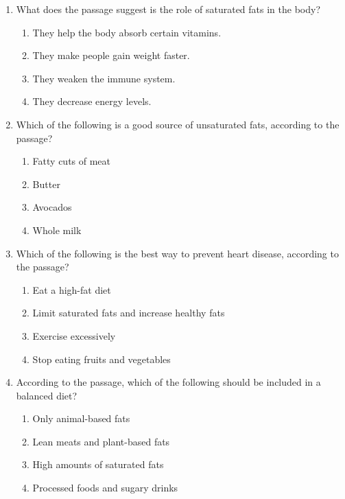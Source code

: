 \documentclass[12pt]{article}
\begin{document}
\begin{enumerate}
    \item What does the passage suggest is the role of saturated fats in the body?
    \begin{enumerate}[label=\Alph*.]
        \item They help the body absorb certain vitamins.
        \item They make people gain weight faster.
        \item They weaken the immune system.
        \item They decrease energy levels.
    \end{enumerate}
    \vspace{0.5cm}

    \item Which of the following is a good source of unsaturated fats, according to the passage?
    \begin{enumerate}[label=\Alph*.]
        \item Fatty cuts of meat
        \item Butter
        \item Avocados
        \item Whole milk
    \end{enumerate}
    \vspace{0.5cm}

    \item Which of the following is the best way to prevent heart disease, according to the passage?
    \begin{enumerate}[label=\Alph*.]
        \item Eat a high-fat diet
        \item Limit saturated fats and increase healthy fats
        \item Exercise excessively
        \item Stop eating fruits and vegetables
    \end{enumerate}
    \vspace{0.5cm}

    \item According to the passage, which of the following should be included in a balanced diet?
    \begin{enumerate}[label=\Alph*.]
        \item Only animal-based fats
        \item Lean meats and plant-based fats
        \item High amounts of saturated fats
        \item Processed foods and sugary drinks
    \end{enumerate}
    \vspace{0.5cm}


\end{enumerate}
\end{document}
